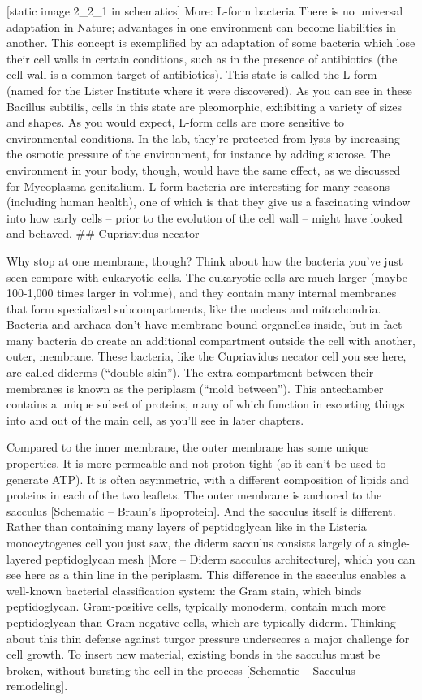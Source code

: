 \documentclass[]{book}
\begin{document}
{[}static image 2\_2\_1 in schematics{]} More: L-form bacteria There is
no universal adaptation in Nature; advantages in one environment can
become liabilities in another. This concept is exemplified by an
adaptation of some bacteria which lose their cell walls in certain
conditions, such as in the presence of antibiotics (the cell wall is a
common target of antibiotics). This state is called the L-form (named
for the Lister Institute where it were discovered). As you can see in
these Bacillus subtilis, cells in this state are pleomorphic, exhibiting
a variety of sizes and shapes. As you would expect, L-form cells are
more sensitive to environmental conditions. In the lab, they're
protected from lysis by increasing the osmotic pressure of the
environment, for instance by adding sucrose. The environment in your
body, though, would have the same effect, as we discussed for Mycoplasma
genitalium. L-form bacteria are interesting for many reasons (including
human health), one of which is that they give us a fascinating window
into how early cells -- prior to the evolution of the cell wall -- might
have looked and behaved. \#\# Cupriavidus necator

Why stop at one membrane, though? Think about how the bacteria you've
just seen compare with eukaryotic cells. The eukaryotic cells are much
larger (maybe 100-1,000 times larger in volume), and they contain many
internal membranes that form specialized subcompartments, like the
nucleus and mitochondria. Bacteria and archaea don't have membrane-bound
organelles inside, but in fact many bacteria do create an additional
compartment outside the cell with another, outer, membrane. These
bacteria, like the Cupriavidus necator cell you see here, are called
diderms (``double skin''). The extra compartment between their membranes
is known as the periplasm (``mold between''). This antechamber contains
a unique subset of proteins, many of which function in escorting things
into and out of the main cell, as you'll see in later chapters.

Compared to the inner membrane, the outer membrane has some unique
properties. It is more permeable and not proton-tight (so it can't be
used to generate ATP). It is often asymmetric, with a different
composition of lipids and proteins in each of the two leaflets. The
outer membrane is anchored to the sacculus {[}Schematic -- Braun's
lipoprotein{]}. And the sacculus itself is different. Rather than
containing many layers of peptidoglycan like in the Listeria
monocytogenes cell you just saw, the diderm sacculus consists largely of
a single-layered peptidoglycan mesh {[}More -- Diderm sacculus
architecture{]}, which you can see here as a thin line in the periplasm.
This difference in the sacculus enables a well-known bacterial
classification system: the Gram stain, which binds peptidoglycan.
Gram-positive cells, typically monoderm, contain much more peptidoglycan
than Gram-negative cells, which are typically diderm. Thinking about
this thin defense against turgor pressure underscores a major challenge
for cell growth. To insert new material, existing bonds in the sacculus
must be broken, without bursting the cell in the process {[}Schematic --
Sacculus remodeling{]}.
\end{document}
